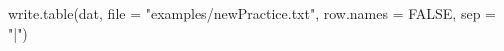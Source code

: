 \begin{Schunk}
\begin{Sinput}
  write.table(dat, file = "examples/newPractice.txt", row.names = FALSE, sep = "|")
\end{Sinput}
\end{Schunk}

